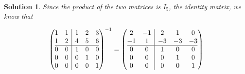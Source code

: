 \documentclass{article}
\newtheorem*{solution}{Solution}
\begin{document}
\begin{solution}
Since the product of the two matrices is $I_{5}$, the identity matrix, we know that

\begin{align*}
\left(
\begin{array}{@{}cc|ccc@{}}
1 & 1 & 1 & 2 & 3 \\
1 & 2 & 4 & 5 & 6 \\ \hline
0 & 0 & 1 & 0 & 0 \\
0 & 0 & 0 & 1 & 0 \\
0 & 0 & 0 & 0 & 1
\end{array}
\right)^{-1} =
\left(
\begin{array}{@{}cc|ccc@{}}
2 & -1 & 2 & 1 & 0 \\
-1 & 1 & -3 & -3 & -3 \\ \hline
0 & 0 & 1 & 0 & 0 \\
0 & 0 & 0 & 1 & 0 \\
0 & 0 & 0 & 0 & 1
\end{array}
\right) 
\end{align*}

\end{solution}
\end{document}
